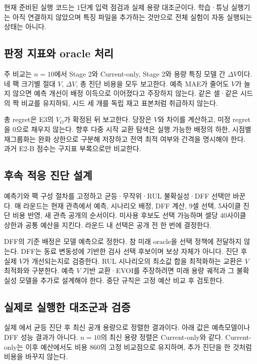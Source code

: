 현재 준비된 실행 코드는 1단계 입력 점검과 실제 용량 대조군이다. 학습·튜닝 실행기는 아직 연결하지 않았으며 특징 파일을 추가하는 것만으로 전체 실험이 자동 실행되는 상태는 아니다.

\subsection*{판정 지표와 oracle 처리}
주 비교는 $n=10$에서 Stage 2와 Current-only, Stage 2와 용량 특징 모델 간 $\Delta V$이다. 네 팩 크기별 절대 $V$, $\Delta V$, 총 진단 비용을 모두 보고한다. 예측 MAE가 줄어도 $V$가 늘지 않으면 예측 개선이 배정 이득으로 이어졌다고 주장하지 않는다. 같은 셀·같은 시드의 짝 비교를 유지하되, 시드 세 개를 독립 재고 표본처럼 취급하지 않는다.

총 regret은 E3의 $V_O$가 확정된 뒤 보고한다. 당장은 $V$와 차이를 계산하고, 미정 regret을 0으로 채우지 않는다. 향후 다중 시작 교환 탐색은 실행 가능한 배정의 하한, 시점별 재그룹화는 완화 상한으로 구분해 저장하고 전역 최적 여부와 간격을 명시해야 한다. 과거 E2-B 점수는 구지표 부록으로만 비교한다.

\subsection*{후속 적응 진단 설계}
예측기와 팩 구성 절차를 고정하고 균등·무작위·RUL 불확실성·DFF 선택만 바꾼다. 매 라운드는 현재 관측에서 예측, 시나리오 배정, DFF 계산, 9셀 선택, 5사이클 진단 비용 반영, 새 관측 공개의 순서이다. 미사용 후보도 선택 가능하며 셀당 40사이클 상한과 공통 예산을 지킨다. 라운드 내 선택은 공개 전 한 번에 결정한다.

DFF의 기준 배정은 모델 예측으로 정한다. 참 미래 oracle을 선택 정책에 전달하지 않는다. DFF는 동료 변동성에 기반한 검사 선택 후보이며 보상 자체가 아니다. 진단 후 실제 $V$가 개선되는지로 검증한다. RUL 시나리오의 최소값 합을 최적화하는 교환은 $V$ 최적화와 구분한다. 예측 $V$ 기반 교환·EVOI를 주장하려면 미래 용량 궤적과 그 불확실성 모델을 추가로 설계해야 한다. 중단 규칙은 고정 예산 비교 후 검토한다.

\clearpage
\subsection*{실제로 실행한 대조군과 검증}
실제 에서 균등 진단 후 최신 공개 용량으로 정렬한 결과이다. 아래 값은 예측모델이나 DFF 성능 결과가 아니다. $n=10$의 최신 용량 정렬은 Current-only와 같다. Current-only는 이후 예산에서도 비용 860의 고정 비교점으로 유지하며, 추가 진단을 한 것처럼 비용을 바꾸지 않는다.

